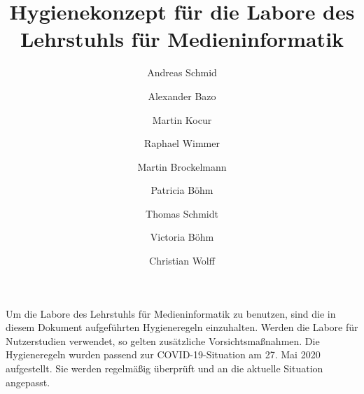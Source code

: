 \documentclass[hidelinks,12pt]{extarticle}
\title{
    \bfseries
    \sffamily
    Hygienekonzept für die Labore des Lehrstuhls für Medieninformatik
}
\author{Andreas Schmid}
\author{Alexander Bazo}
\author{Martin Kocur}
\author{Raphael Wimmer}
\author{Martin Brockelmann}
\author{Patricia Böhm}
\author{Thomas Schmidt}
\author{Victoria Böhm}
\author{Christian Wolff}
\affil{Lehrstuhl für Medieninformatik, Universität Regensburg}
\begin{document}
\onehalfspacing
\maketitle

\noindent
Um die Labore des Lehrstuhls für Medieninformatik zu benutzen, sind die in diesem Dokument aufgeführten Hygieneregeln einzuhalten.
Werden die Labore für Nutzerstudien verwendet, so gelten zusätzliche Vorsichtsmaßnahmen.
Die Hygieneregeln wurden passend zur COVID-19-Situation am 27. Mai 2020 aufgestellt.
Sie werden regelmäßig überprüft und an die aktuelle Situation angepasst.

\newpage
\tableofcontents 














\end{document}
